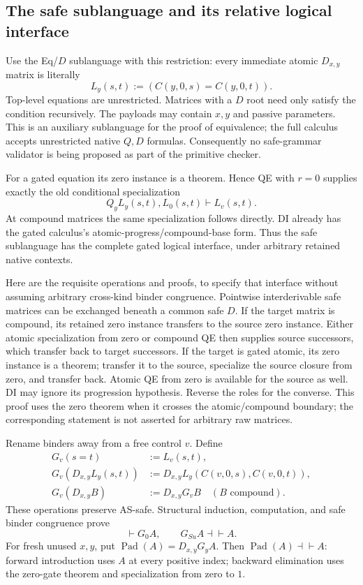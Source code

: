 \subsection{The safe sublanguage and its relative logical interface}

Use the Eq/$D$ sublanguage with this restriction: every immediate
atomic $D_{x,y}$ matrix is literally
\[
 L_y(s,t):=(C(y,0,s)=C(y,0,t)).
 \tag{AS-safe}
\]
Top-level equations are unrestricted. Matrices with a $D$ root need
only satisfy the condition recursively. The payloads may contain
$x,y$ and passive parameters. This is an auxiliary sublanguage for
the proof of equivalence; the full calculus accepts unrestricted
native $Q,D$ formulas. Consequently no safe-grammar validator is
being proposed as part of the primitive checker.

For a gated equation its zero instance is a theorem. Hence QE with
$r=0$ supplies exactly the old conditional specialization
\[
 Q_yL_y(s,t),L_0(s,t)\vdash L_v(s,t).
\]
At compound matrices the same specialization follows directly.
DI already has the gated calculus's atomic-progress/compound-base
form. Thus the safe sublanguage has the complete gated logical
interface, under arbitrary retained native contexts.

Here are the requisite operations and proofs, to specify that interface
without assuming arbitrary cross-kind binder congruence. Pointwise
interderivable safe matrices can be exchanged beneath a common safe
$D$. If the target matrix is compound, its retained zero instance
transfers to the source zero instance. Either atomic specialization
from zero or compound QE then supplies source successors, which
transfer back to target successors. If the target is gated atomic,
its zero instance is a theorem; transfer it to the source, specialize
the source closure from zero, and transfer back. Atomic QE from zero
is available for the source as well. DI may ignore its progression
hypothesis. Reverse the roles for the converse. This proof uses
the zero theorem when it crosses the atomic/compound boundary;
the corresponding statement is not asserted for arbitrary raw matrices.

Rename binders away from a free control $v$. Define
\begin{align*}
 G_v(s=t)&:=L_v(s,t),\\
 G_v(D_{x,y}L_y(s,t))
   &:=D_{x,y}L_y(C(v,0,s),C(v,0,t)),\\
 G_v(D_{x,y}B)&:=D_{x,y}G_vB
       \quad(B\text{ compound}).
\end{align*}
These operations preserve AS-safe. Structural induction, computation,
and safe binder congruence prove
\[
 \vdash G_0A,\qquad G_{Su}A\dashv\vdash A.
 \tag{AS-gate}
\]
For fresh unused $x,y$, put
$\operatorname{Pad}(A)=D_{x,y}G_yA$. Then
$\operatorname{Pad}(A)\dashv\vdash A$: forward introduction uses
$A$ at every positive index; backward elimination uses the zero-gate
theorem and specialization from zero to $1$.

